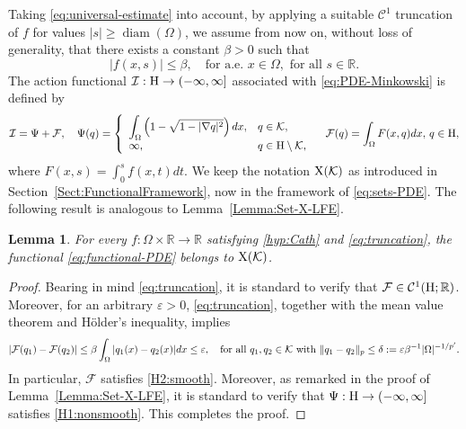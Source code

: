 \documentclass{article}
\newcommand{\boC}{\mathcal{C}}
\newcommand{\boK}{\mathcal{K}}
\newcommand{\boI}{\mathcal{I}}
\newcommand{\R}{\mathbb{R}}
\newcommand{\boF}{\mathcal{F}}
\newcommand{\Hilb}{{\textnormal H}}
\newcommand{\X}{{\textnormal X}}
\newtheorem{lemma}{Lemma}[section]
\theoremstyle{definition}
\begin{document}
Taking \eqref{eq:universal-estimate} into account, by applying a suitable $\boC^1$ truncation of $f$ for values $|s|\geq\operatorname{diam}(\Omega)$, we assume from now on, without loss of generality, that there exists a constant $\beta>0$ such that 
\begin{equation}\label{eq:truncation}
    |f(x,s)|\leq \beta,\quad\text{for a.e. } x\in \Omega, \text{ for all }s\in\R.
\end{equation}
The action functional $\boI:\Hilb\to(-\infty,\infty]$ associated with \eqref{eq:PDE-Minkowski} is defined by
\begin{equation}\label{eq:functional-PDE}
    \boI=\Psi+\boF,\quad \Psi(q)=\left\{\begin{array}{ll}\displaystyle\int_\Omega\left(1-\sqrt{1-|\nabla q|^2}\right) dx,&q\in\boK,\\
        \infty,&  q\in\Hilb\setminus\boK,
   \end{array}\right.\quad\boF(q)=\int_\Omega F(x,q)dx,\,q\in\Hilb,
\end{equation}
where $F(x,s)=\int_0^s f(x,t)dt$. We keep the notation $\X(\boK)$ as introduced in Section~\ref{Sect:FunctionalFramework}, now in the framework of \eqref{eq:sets-PDE}. The following result is analogous to Lemma~\ref{Lemma:Set-X-LFE}.
\begin{lemma}\label{lemma:functional-PDE}
For every $f:\Omega\times\R\to\R$ satisfying \eqref{hyp:Cath} and \eqref{eq:truncation}, the functional \eqref{eq:functional-PDE} belongs to $\X(\boK)$.
\end{lemma}
\begin{proof}
Bearing in mind \eqref{eq:truncation}, it is standard to verify that $\boF\in\boC^1(\Hilb;\R)$. Moreover, for an arbitrary $\varepsilon>0$, \eqref{eq:truncation}, together with the mean value theorem and Hölder's inequality, implies
\begin{equation}
    |\boF(q_1)-\boF(q_2)|\leq\beta \int_\Omega|q_1(x)-q_2(x)|dx\leq\varepsilon ,\quad\hbox{for all }q_1,q_2\in\boK \text{ with }\|q_1-q_2\|_p\leq\delta:=\varepsilon\beta^{-1}|\Omega|^{-1/p'}.
\end{equation}
In particular, $\boF$ satisfies \ref{H2:smooth}. Moreover, as remarked in the proof of Lemma~\ref{Lemma:Set-X-LFE}, it is standard to verify that $\Psi:\Hilb\to(-\infty,\infty]$ satisfies \ref{H1:nonsmooth}. This completes the proof.
\end{proof}
\end{document}
